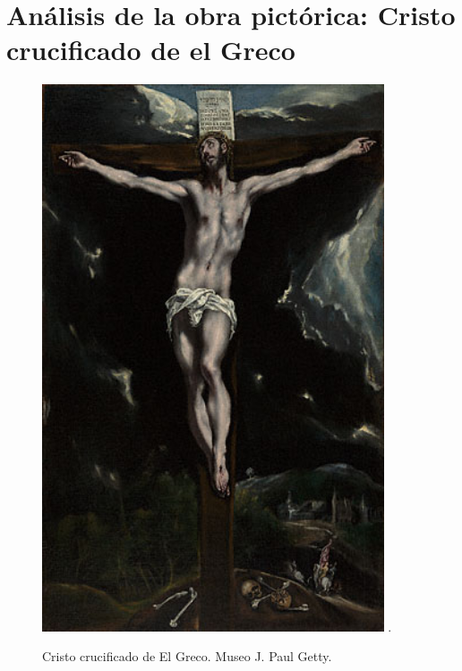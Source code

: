 \section{Análisis de la obra pictórica: Cristo crucificado de el Greco}

\begin{figure}[ht!]
    \centering
    \includegraphics[width=0.9\textwidth]{elgreco.jpg}
   .\caption{Cristo crucificado de El Greco. Museo J. Paul Getty.} %
\end{figure}

\newpage




